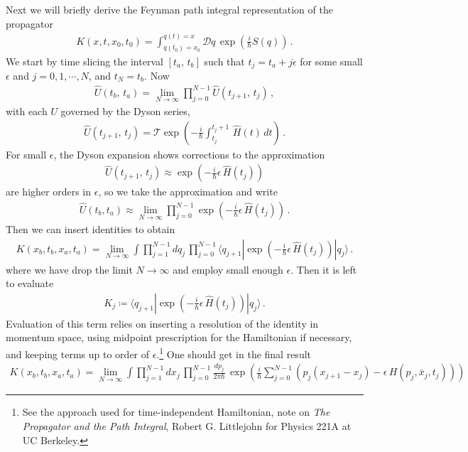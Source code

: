 \documentclass[11pt, onesided]{book}
\theoremstyle{break}
\theoremstyle{break}
\begin{document}
Next we will briefly derive the Feynman path integral representation of the propagator 
\begin{align*}
K(x,t,x_0,t_0) = \int_{q(t_0) = x_0}^{q(t) = x} \mathcal{D}q \, \exp\left( \frac{i}{\hbar}S(q)\right)\,.
\end{align*}
We start by time slicing the interval $[t_a,\,t_b]$ such that $t_j = t_a + j\epsilon$ for some small $\epsilon$ and $j = 0,1,\cdots, N$, and $t_N = t_b$. Now 
\begin{align*}
\hat{U}(t_b,\, t_a) = \lim_{N\to \infty} \prod_{j=0}^{N-1} \hat{U} (t_{j+1},\,t_j) \,,
\end{align*}
with each $U$ governed by the Dyson series, 
\begin{align*}
\hat{U}(t_{j+1},\, t_j) = \mathcal{T}\exp\left(
-\frac{i}{\hbar}\int_{t_j}^{t_j+1}\, \hat{H}(t)\, dt
\right)\,.
\end{align*}
For small $\epsilon$, the Dyson expansion shows corrections to the approximation
\begin{align*}
\hat{U}(t_{j+1},\, t_j) \approx \exp\left( - \frac{i}{\hbar}\epsilon\, \hat{H}(t_j)\right)
\end{align*}
are higher orders in $\epsilon$, so we take the approximation and write
\begin{align*}
\hat{U}(t_b,t_a) \approx \lim_{N\to \infty} \prod_{j=0}^{N-1} \exp\left( -\frac{i}{\hbar}\epsilon \, \hat{H}(t_j)\right)\,.
\end{align*}
Then we can insert identities to obtain 
\begin{align*}
K(x_b,t_b, x_a,t_a) = \lim_{N\to \infty}\int \prod_{j=1}^{N-1} dq_j\, \prod_{j=0}^{N-1} \langle q_{j+1} | \exp \left( -\frac{i}{\hbar}\epsilon \, \hat{H}(t_j)\right)|q_j\rangle\,.
\end{align*}
where we have drop the limit $N \to \infty$ and employ small enough $\epsilon$. Then it is left to evaluate
\begin{align*}
K_j \coloneqq
\langle q_{j+1} | \exp  \left(-\frac{i}{\hbar}\epsilon \, \hat{H}(t_j)\right)|q_j\rangle\,.
\end{align*}
Evaluation of this term relies on inserting a resolution of the identity in momentum space, using midpoint prescription for the Hamiltonian if necessary, and keeping terms up to order of $\epsilon$.\footnote{See the approach used for time-independent Hamiltonian, note on \textit{The Propagator and the Path Integral}, Robert G. Littlejohn for Physics 221A at UC Berkeley.} One should get in the final result
\begin{align*}
K(x_b,t_b, x_a,t_a) = \lim_{N\to \infty} \int
\prod_{j=1}^{N-1}dx_j\, \prod_{j=0}^{N-1} \frac{dp_j}{2\pi \hbar}\,\exp\left(
\frac{i}{\hbar}\sum_{j=0}^{N-1} \left( p_j(x_{j+1}-x_j) - \epsilon \, H(p_j,\bar{x}_j,t_j)\right)
\right)
\end{align*}
\end{document}

